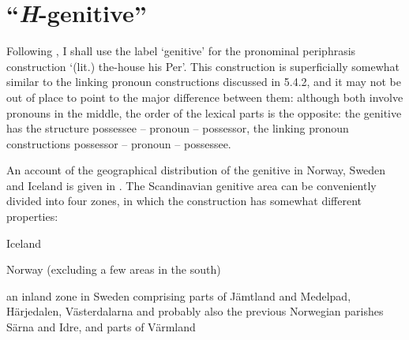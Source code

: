 {{%

\section{“\textit{H}{}-genitive”}
\label{bkm:Ref154988643}
Following \citet{Delsing2003b}, I shall use the label ‘genitive’ for the pronominal periphrasis construction  ‘(lit.) the-house his Per’. This construction is superficially somewhat similar to the linking pronoun constructions discussed in 5.4.2, and it may not be out of place to point to the major difference between them: although both involve pronouns in the middle, the order of the lexical parts is the opposite: the genitive has the structure possessee – pronoun – possessor, the linking pronoun constructions possessor – pronoun – possessee.


An account of the geographical distribution of the genitive in Norway, Sweden and Iceland is given in \citet[34]{Delsing2003a}. The Scandinavian genitive area can be conveniently divided into four zones, in which the construction has somewhat different properties:


\item 

Iceland


\item 

Norway (excluding a few areas in the south) 


\item 

an inland zone in Sweden comprising parts of Jämtland and Medelpad, Härjedalen, Västerdalarna and probably also the previous Norwegian parishes Särna and Idre, and parts of Värmland

}}
